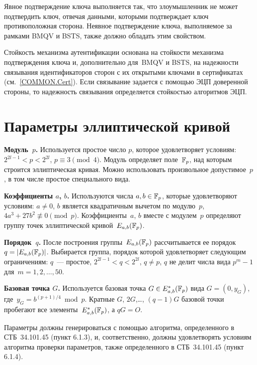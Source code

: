 Явное подтверждение ключа выполняется так, что злоумышленник
не может подтвердить ключ, отвечая данными,
которыми подтверждает ключ противоположная сторона.
%
Неявное подтверждение ключа, выполняемое за рамками BMQV и BSTS, 
также должно обладать этим свойством.

Стойкость механизма аутентификации основана на 
стойкости механизма подтверждения ключа и, дополнительно 
для~BMQV и BSTS, на надежности связывания 
идентификаторов сторон с их открытыми ключами в сертификатах 
(см.~\ref{COMMON.Cert}).
%
Если связывание задается с помощью ЭЦП доверенной стороны,
то надежность связывания определяется стойкостью алгоритмов ЭЦП.


\section{Параметры эллиптической кривой}\label{COMMON.Params}

{\bf Модуль~$p$.} 
Используется простое число $p$, которое удовлетворяет условиям:
$2^{2l-1}<p<2^{2l}$, $p\equiv 3\pmod{4}$.
%
Модуль определяет поле~$\mathbb{F}_p$, 
над которым строится эллиптическая кривая.
%
Можно использовать произвольное допустимое~$p$, 
в том числе простое специального вида.

{\bf Коэффициенты $a$, $b$.} 
Используются числа $a,b\in\mathbb{F}_p$, которые удовлетворяют условиям:
$a\neq 0$,
$b$ является квадратичным вычетом по модулю~$p$,
$4a^3+27b^2\not\equiv 0\pmod{p}$.
%
Коэффициенты~$a$, $b$ вместе с модулем~$p$ 
определяют группу точек эллиптической кривой~$E_{a,b}(\mathbb{F}_p)$.

{\bf Порядок~$q$.}
После построения группы~$E_{a,b}(\mathbb{F}_p)$ рассчитывается 
ее порядок~$q=|E_{a,b}(\mathbb{F}_p)|$.
%
Выбирается группа, порядок которой удовлетворяет следующим ограничениям:
$q$~--- простое,
$2^{2l-1}<q<2^{2l}$,
$q\neq p$,
$q$ не делит числа вида $p^m-1$ для~$m=1,2,\ldots,50$.

{\bf Базовая точка $G$.}
Используется базовая
точка $G\in E_{a,b}^*(\mathbb{F}_p)$ вида $G=(0,y_G)$,
где~$y_G=b^{(p+1)/4}\bmod{p}$.
%
Кратные $G$, $2G$,\ldots, $(q-1)G$ базовой точки
пробегают все элементы~$E_{a,b}^*(\mathbb{F}_p)$, а $qG=O$.

Параметры должны генерироваться с помощью алгоритма, определенного в
СТБ~34.101.45 (пункт 6.1.3), и, соответственно, должны удовлетворять 
условиям алгоритма проверки параметров, также определенного в СТБ~34.101.45 
(пункт 6.1.4).

